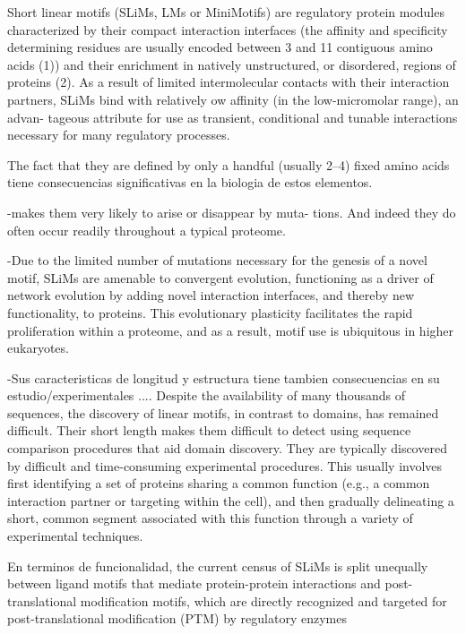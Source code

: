 Short linear motifs (SLiMs, LMs or MiniMotifs) are regulatory protein modules characterized by their compact interaction interfaces (the affinity and specificity
determining residues are usually encoded between 3 and 11 contiguous amino acids (1)) and their enrichment in
natively unstructured, or disordered, regions of proteins (2). As a result of limited intermolecular contacts with their interaction partners, SLiMs bind with relatively
ow affinity (in the low-micromolar range), an advan-
tageous attribute for use as transient, conditional and
tunable interactions necessary for many regulatory
processes. 



The fact that they are defined by only a handful (usually 2–4) fixed amino acids 
tiene consecuencias significativas en la biologia de estos elementos. 

-makes them very likely to arise or disappear by muta-
tions. And indeed they do often occur readily throughout a
typical proteome.

-Due to the limited number of mutations
necessary for the genesis of a novel motif, SLiMs are
amenable to convergent evolution, functioning as a
driver of network evolution by adding novel interaction
interfaces, and thereby new functionality, to proteins. This
evolutionary plasticity facilitates the rapid proliferation
within a proteome, and as a result, motif use is ubiquitous
in higher eukaryotes.

-Sus caracteristicas de longitud y estructura tiene tambien consecuencias en su estudio/experimentales ....
Despite the availability of many thousands of sequences, the discovery of linear motifs, in contrast to domains, has remained difficult. 
Their short length makes them difficult to detect using sequence comparison procedures that aid domain discovery. 
They are typically discovered by difficult and time-consuming experimental procedures. 
This usually involves first identifying a set of proteins sharing a common function (e.g., a common interaction partner or targeting within the cell), and then gradually delineating
a short, common segment associated with this function through a variety of experimental techniques.


En terminos de funcionalidad, the current census of SLiMs is split unequally between ligand motifs that mediate protein-protein interactions  and post-translational modification motifs, which are directly
recognized and targeted for post-translational modification (PTM) by regulatory enzymes


